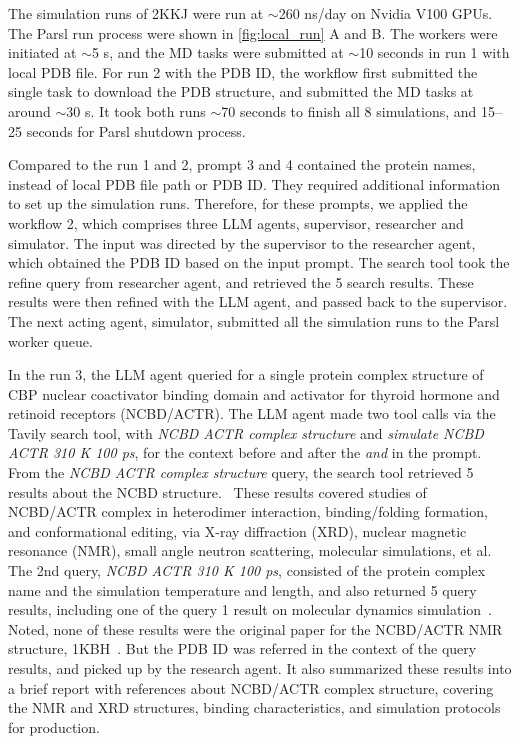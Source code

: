 The simulation runs of 2KKJ were run at $\sim$260 ns/day on Nvidia V100 GPUs. 
The Parsl run process were shown in \autoref{fig:local_run} A and B. 
The workers were initiated at $\sim$5 s, and the MD tasks were submitted at $\sim$10 seconds in run 1 with local PDB file. 
For run 2 with the PDB ID, the workflow first submitted the single task to download the PDB structure, and submitted the MD tasks at around $\sim$30 s. 
It took both runs $\sim$70 seconds to finish all 8 simulations, and 15–25 seconds for Parsl shutdown process. 

Compared to the run 1 and 2, prompt 3 and 4 contained the protein names, instead of local PDB file path or PDB ID. 
They required additional information to set up the simulation runs. 
Therefore, for these prompts, we applied the workflow 2, which comprises three LLM agents, supervisor, researcher and simulator. 
The input was directed by the supervisor to the researcher agent, which obtained the PDB ID based on the input prompt. 
The search tool took the refine query from researcher agent, and retrieved the 5 search results. 
These results were then refined with the LLM agent, and passed back to the supervisor. 
The next acting agent, simulator, submitted all the simulation runs to the Parsl worker queue. 

In the run 3, the LLM agent queried for a single protein complex structure of CBP nuclear coactivator binding domain and activator for thyroid hormone and retinoid receptors (NCBD/ACTR). 
The LLM agent made two tool calls via the Tavily search tool, with \emph{NCBD ACTR complex structure} and \emph{simulate NCBD ACTR 310 K 100 ps}, for the context before and after the \emph{and} in the prompt. 
From the \emph{NCBD ACTR complex structure} query, the search tool retrieved 5 results about the NCBD structure.~\cite{dogan2013transition_ncbd,marino2018charge_ncbd,chen2023structural_ncbd,bauer2021conformational_ncbd,karlsson2019structurally_ncbd}
These results covered studies of NCBD/ACTR complex in heterodimer interaction, binding/folding formation, and conformational editing, via X-ray diffraction (XRD), nuclear magnetic resonance (NMR), small angle neutron scattering, molecular simulations, et al. 
The 2nd query, \emph{NCBD ACTR 310 K 100 ps}, consisted of the protein complex name and the simulation temperature and length, and also returned 5 query results, including one of the query 1 result on molecular dynamics simulation~\cite{karlsson2019structurally_ncbd}. 
Noted, none of these results were the original paper for the NCBD/ACTR NMR structure, 1KBH~\cite{demarest2002mutual_1kbh}. 
But the PDB ID was referred in the context of the query results, and picked up by the research agent. 
It also summarized these results into a brief report with references about NCBD/ACTR complex structure, covering the NMR and XRD structures, binding characteristics, and simulation protocols for production. 

